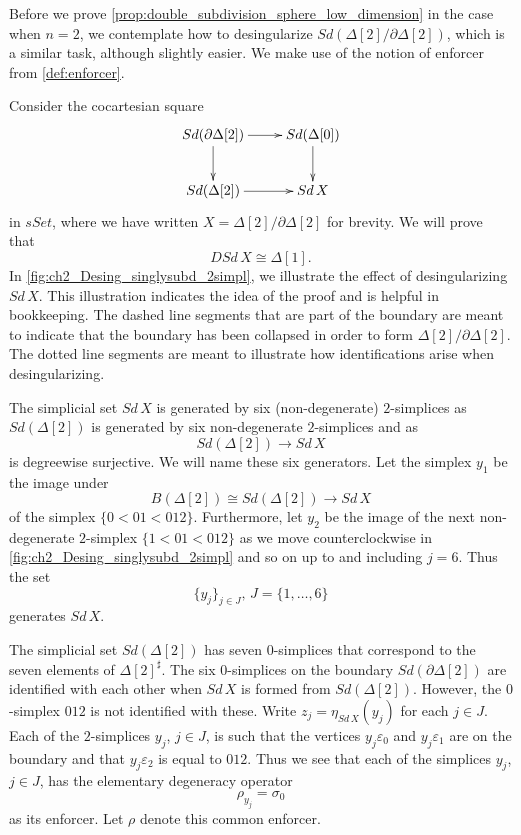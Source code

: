 Before we prove \cref{prop:double_subdivision_sphere_low_dimension} in the case when $n=2$, we contemplate how to desingularize $Sd(\Delta [2]/\partial \Delta [2])$, which is a similar task, although slightly easier. We make use of the notion of enforcer from \cref{def:enforcer}.
\begin{example}\label{ex:desingularization_model_n-sphere_subdivided}
Consider the cocartesian square
\begin{equation}
\label{eq:first_diagram_ex_desingularization_model_n-sphere_subdivided}
\begin{gathered}
\xymatrix{
Sd(\partial \Delta [2]) \ar[d] \ar[r] & Sd(\Delta [0]) \ar[d] \\
Sd(\Delta [2]) \ar[r] & Sd\, X
}
\end{gathered}
\end{equation}
in $sSet$, where we have written $X=\Delta [2]/\partial \Delta [2]$ for brevity. We will prove that
\begin{equation}\label{eq:first_equation_desingularization_model_n-sphere_subdivided}
DSd\, X\cong \Delta [1].
\end{equation}
In \cref{fig:ch2_Desing_singlysubd_2simpl}, we illustrate the effect of desingularizing $Sd\, X$. This illustration indicates the idea of the proof and is helpful in bookkeeping. The dashed line segments that are part of the boundary are meant to indicate that the boundary has been collapsed in order to form $\Delta [2]/\partial \Delta [2]$. The dotted line segments are meant to illustrate how identifications arise when desingularizing.

The simplicial set $Sd\, X$ is generated by six (non-degenerate) $2$-simplices as $Sd(\Delta [2])$ is generated by six non-degenerate $2$-simplices and as
\[Sd(\Delta [2])\to Sd\, X\]
is degreewise surjective. We will name these six generators. Let the simplex $y_1$ be the image under
\[B(\Delta [2])\cong Sd(\Delta [2])\to Sd\, X\]
of the simplex $\{0<01<012\}$. Furthermore, let $y_2$ be the image of the next non-degenerate $2$-simplex $\{1<01<012\}$ as we move counterclockwise in \cref{fig:ch2_Desing_singlysubd_2simpl} and so on up to and including $j=6$. Thus the set
\[\{y_j\} _{j\in J},\, J=\{ 1,\dots ,6\}\]
generates $Sd\, X$.

The simplicial set $Sd(\Delta [2])$ has seven $0$-simplices that correspond to the seven elements of $\Delta [2]^\sharp$. The six $0$-simplices on the boundary $Sd(\partial \Delta [2])$ are identified with each other when $Sd\, X$ is formed from $Sd(\Delta [2])$. However, the $0$-simplex $012$ is not identified with these. Write $z_j=\eta _{Sd\, X}(y_j)$ for each $j\in J$. Each of the $2$-simplices $y_j$, $j\in J$, is such that the vertices $y_j\varepsilon _0$ and $y_j\varepsilon _1$ are on the boundary and that $y_j\varepsilon _2$ is equal to $012$. Thus we see that each of the simplices $y_j$, $j\in J$, has the elementary degeneracy operator
\[\rho _{y_j}=\sigma _0\]
as its enforcer. Let $\rho$ denote this common enforcer.


\end{example}
